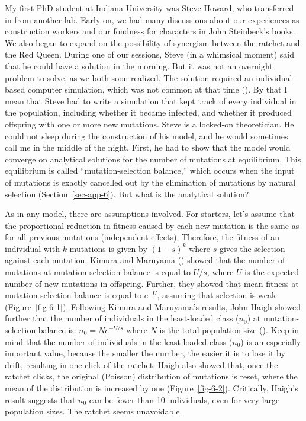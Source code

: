 \documentclass[
  letterpaper,
]{book}
\begin{document}
My first PhD student at Indiana University was Steve Howard, who
transferred in from another lab. Early on, we had many discussions about
our experiences as construction workers and our fondness for characters
in John Steinbeck's books. We also began to expand on the possibility of
synergism between the ratchet and the Red Queen. During one of our
sessions, Steve (in a whimsical moment) said that he could have a
solution in the morning. But it was not an overnight problem to solve,
as we both soon realized. The solution required an individual-based
computer simulation, which was not common at that time
(). By that I mean that Steve had
to write a simulation that kept track of every individual in the
population, including whether it became infected, and whether it
produced offspring with one or more new mutations. Steve is a locked-on
theoretician. He could not sleep during the construction of his model,
and he would sometimes call me in the middle of the night. First, he had
to show that the model would converge on analytical solutions for the
number of mutations at equilibrium. This equilibrium is called
``mutation-selection balance,'' which occurs when the input of mutations
is exactly cancelled out by the elimination of mutations by natural
selection (Section~\ref{sec-app-6}). But what is the analytical
solution?

As in any model, there are assumptions involved. For starters, let's
assume that the proportional reduction in fitness caused by each new
mutation is the same as for all previous mutations (independent
effects). Therefore, the fitness of an individual with \(k\) mutations
is given by \((1-s)^k\) where \(s\) gives the selection against each
mutation. Kimura and Maruyama () showed
that the number of mutations at mutation-selection balance is equal to
\(U/s\), where \(U\) is the expected number of new mutations in
offspring. Further, they showed that mean fitness at mutation-selection
balance is equal to \(e^{-U}\), assuming that selection is weak
(Figure~\ref{fig-6-1}). Following Kimura and Maruyama's results, John
Haigh showed further that the number of individuals in the least-loaded
class (\(n_0\)) at mutation-selection balance is: \(n_0=Ne^{-U/s}\)
where \(N\) is the total population size
(). Keep in mind that the number of
individuals in the least-loaded class (\(n_0\)) is an especially
important value, because the smaller the number, the easier it is to
lose it by drift, resulting in one click of the ratchet. Haigh also
showed that, once the ratchet clicks, the original (Poisson)
distribution of mutations is reset, where the mean of the distribution
is increased by one (Figure~\ref{fig-6-2}). Critically, Haigh's result
suggests that \(n_0\) can be fewer than 10 individuals, even for very
large population sizes. The ratchet seems unavoidable.
\end{document}
